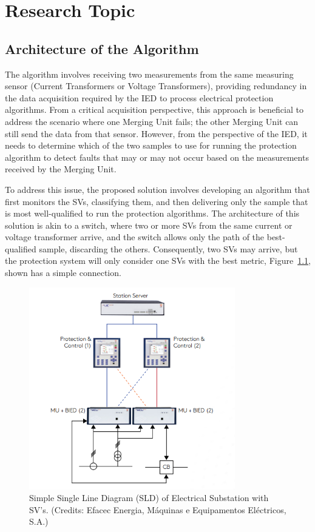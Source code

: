 \chapter{Research Topic} %
\section{Architecture of the Algorithm}

The algorithm involves receiving two measurements from the same measuring sensor (Current Transformers or Voltage Transformers), providing redundancy in the data acquisition required by the IED to process electrical protection algorithms. From a critical acquisition perspective, this approach is beneficial to address the scenario where one Merging Unit fails; the other Merging Unit can still send the data from that sensor. However, from the perspective of the IED, it needs to determine which of the two samples to use for running the protection algorithm to detect faults that may or may not occur based on the measurements received by the Merging Unit.

To address this issue, the proposed solution involves developing an algorithm that first monitors the SVs, classifying them, and then delivering only the sample that is most well-qualified to run the protection algorithms. The architecture of this solution is akin to a switch, where two or more SVs from the same current or voltage transformer arrive, and the switch allows only the path of the best-qualified sample, discarding the others. Consequently, two SVs may arrive, but the protection system will only consider one SVs with the best metric, Figure~\ref{fig:SLD_Diagram}, shown has a simple connection.

\begin{figure}[tbh]
	\centering
	\includegraphics[width=0.8\textwidth, keepaspectratio]{ch3/assets/SLD_Diagram.png}
	\caption{Simple Single Line Diagram (SLD) of Electrical Substation with SV's. (Credits: Efacec Energia, Máquinas e Equipamentos Eléctricos, S.A.)}
	\label{fig:SLD_Diagram}
\end{figure}
\FloatBarrier


